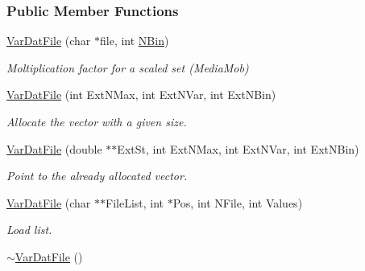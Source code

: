 \subsubsection*{Public Member Functions}
\begin{DoxyCompactItemize}
\item 
\hyperlink{classVarDatFile_a21fde0fe885a9c32bed3f479030b932f}{Var\+Dat\+File} (char $\ast$file, int \hyperlink{classVarDatFile_a6a683d7b3c08aafd7a5329b0d293eab6}{N\+Bin})
\begin{DoxyCompactList}\small\item\em Moltiplication factor for a scaled set (Media\+Mob) \end{DoxyCompactList}\item 
\hyperlink{classVarDatFile_aee213a28901788f8039811a1849fd829}{Var\+Dat\+File} (int Ext\+N\+Max, int Ext\+N\+Var, int Ext\+N\+Bin)\hypertarget{classVarDatFile_aee213a28901788f8039811a1849fd829}{}\label{classVarDatFile_aee213a28901788f8039811a1849fd829}

\begin{DoxyCompactList}\small\item\em Allocate the vector with a given size. \end{DoxyCompactList}\item 
\hyperlink{classVarDatFile_a8a83d164588d4aadbf15e250d29b5a6b}{Var\+Dat\+File} (double $\ast$$\ast$Ext\+St, int Ext\+N\+Max, int Ext\+N\+Var, int Ext\+N\+Bin)\hypertarget{classVarDatFile_a8a83d164588d4aadbf15e250d29b5a6b}{}\label{classVarDatFile_a8a83d164588d4aadbf15e250d29b5a6b}

\begin{DoxyCompactList}\small\item\em Point to the already allocated vector. \end{DoxyCompactList}\item 
\hyperlink{classVarDatFile_ac31e8053d3ade20d6b08259849c87976}{Var\+Dat\+File} (char $\ast$$\ast$File\+List, int $\ast$Pos, int N\+File, int Values)\hypertarget{classVarDatFile_ac31e8053d3ade20d6b08259849c87976}{}\label{classVarDatFile_ac31e8053d3ade20d6b08259849c87976}

\begin{DoxyCompactList}\small\item\em Load list. \end{DoxyCompactList}\item 
\hyperlink{classVarDatFile_acbe3dc1b93a2c0aa2cf310056bef0287}{$\sim$\+Var\+Dat\+File} ()\hypertarget{classVarDatFile_acbe3dc1b93a2c0aa2cf310056bef0287}{}\label{classVarDatFile_acbe3dc1b93a2c0aa2cf310056bef0287}


\end{DoxyCompactItemize}
